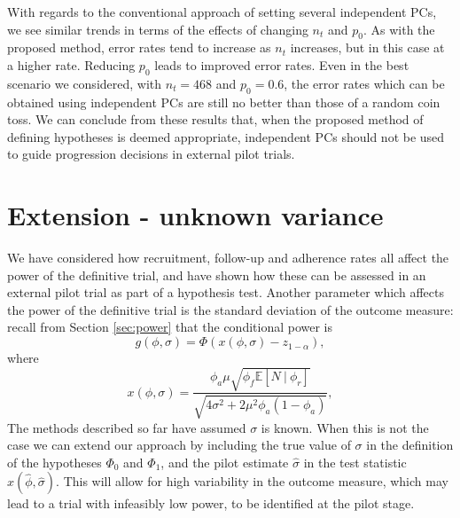 \documentclass[AMA,STIX1COL]{WileyNJD-v2}
\begin{document}
With regards to the conventional approach of setting several independent PCs, we see similar trends in terms of the effects of changing $n_t$ and $p_0$. As with the proposed method, error rates tend to increase as $n_t$ increases, but in this case at a higher rate. Reducing $p_0$ leads to improved error rates. Even in the best scenario we considered, with $n_t = 468$ and $p_0 = 0.6$, the error rates which can be obtained using independent PCs are still no better than those of a random coin toss. We can conclude from these results that, when the proposed method of defining hypotheses is deemed appropriate, independent PCs should not be used to guide progression decisions in external pilot trials.

\section{Extension - unknown variance}\label{sec:extension}

We have considered how recruitment, follow-up and adherence rates all affect the power of the definitive trial, and have shown how these can be assessed in an external pilot trial as part of a hypothesis test. Another parameter which affects the power of the definitive trial is the standard deviation of the outcome measure: recall from Section \ref{sec:power} that the conditional power is 
$$
g(\phi, \sigma) = \Phi \left( x(\phi, \sigma) - z_{1-\alpha} \right),
$$
where
$$
x(\phi, \sigma) =  \frac{ \phi_a\mu \sqrt{\phi_f \mathbb{E}[N ~|~ \phi_r]} } {\sqrt{4\sigma^2 + 2 \mu^2 \phi_a(1-\phi_a)}},
$$
The methods described so far have assumed $\sigma$ is known. When this is not the case we can extend our approach by including the true value of $\sigma$ in the definition of the hypotheses $\Phi_0$ and $\Phi_1$, and the pilot estimate $\hat{\sigma}$ in the test statistic $x(\hat{\phi}, \hat{\sigma})$. This will allow for high variability in the outcome measure, which may lead to a trial with infeasibly low power, to be identified at the pilot stage.
\end{document}
